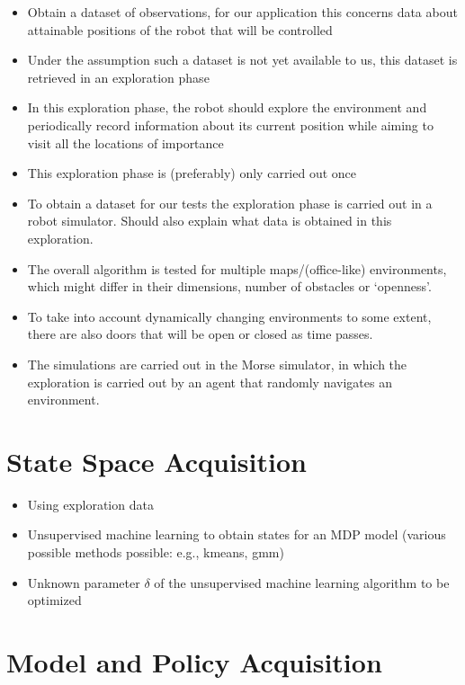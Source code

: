 \begin{itemize}
	\item Obtain a dataset of observations, for our application this concerns data about attainable positions of the robot that will be controlled
	\item Under the assumption such a dataset is not yet available to us, this dataset is retrieved in an exploration phase
	\item In this exploration phase, the robot should explore the environment and periodically record information about its current position while aiming to visit all the locations of importance
	\item This exploration phase is (preferably) only carried out once
	\item To obtain a dataset for our tests the exploration phase is carried out in a robot simulator. Should also explain what data is obtained in this exploration.
	\item The overall algorithm is tested for multiple maps/(office-like) environments, which might differ in their dimensions, number of obstacles or `openness'.
	\item To take into account dynamically changing environments to some extent, there are also doors that will be open or closed as time passes.
	\item The simulations are carried out in the Morse simulator, in which the exploration is carried out by an agent that randomly navigates an environment.
\end{itemize}

\section{State Space Acquisition}
\label{sec:state-space-aggregation}

% 

\begin{itemize}
	\item Using exploration data
	\item Unsupervised machine learning to obtain states for an MDP model (various possible methods possible: e.g., kmeans, gmm)
	\item Unknown parameter $\delta$ of the unsupervised machine learning algorithm to be optimized
\end{itemize}

\section{Model and Policy Acquisition}
\label{sec:model-policy-acquisition}

